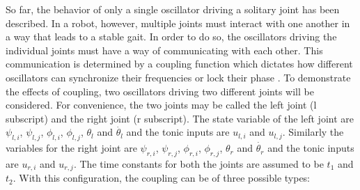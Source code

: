 \documentclass[12pt,twoside]{article}
\theoremstyle{plain}
\theoremstyle{definition}
\theoremstyle{remark}
\newcommand{\forceindent}{\leavevmode{\parindent=2em\indent}}
\begin{document}
\forceindent So far, the behavior of only a single oscillator driving a solitary joint has been described. In a robot, however, multiple joints must interact with one another in a way that leads to a stable gait. In order to do so, the oscillators driving the individual joints must have a way of communicating with each other. This communication is determined by a coupling function which dictates how different oscillators can synchronize their frequencies or lock their phase \cite{Ronsse2009}. To demonstrate the effects of coupling, two oscillators driving two different joints will be considered. For convenience, the two joints may be called the left joint (l subscript) and the right joint (r subscript). The state variable of the left joint are $\psi_{l,i}$, $\psi_{l,j}$, $\phi_{l,i}$, $\phi_{l,j}$, $\theta_l$ and $\dot{\theta_l}$ and the tonic inputs are $u_{l,i}$ and $u_{l,j}$. Similarly the variables for the right joint are $\psi_{r,i}$, $\psi_{r,j}$, $\phi_{r,i}$, $\phi_{r,j}$, $\theta_r$ and $\dot{\theta_r}$ and the tonic inputs are $u_{r,i}$ and $u_{r,j}$. The time constants for both the joints are assumed to be $t_1$ and $t_2$. With this configuration, the coupling can be of three possible types:
\end{document}
